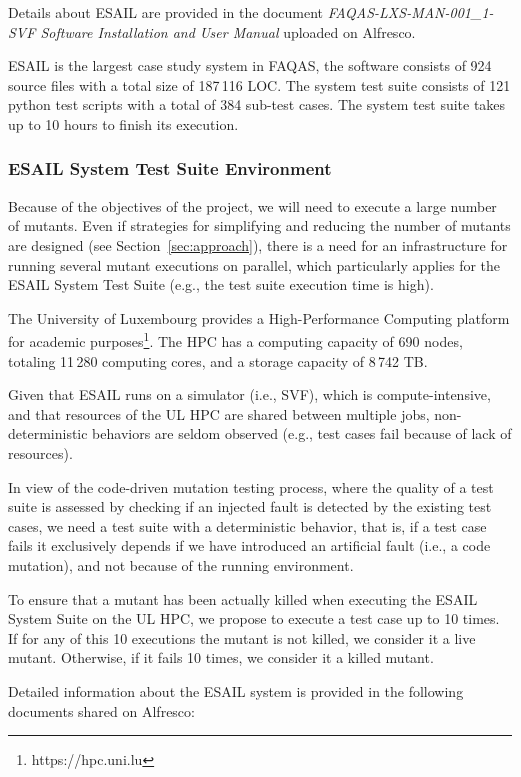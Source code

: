Details about ESAIL are provided in the document \emph{FAQAS-LXS-MAN-001\_1- SVF Software Installation and User Manual} uploaded on Alfresco.

ESAIL is the largest case study system in FAQAS, the software consists of 924 source files with a total size of 187\,116 LOC. The system test suite consists of 121 python test scripts with a total of 384 sub-test cases. The system test suite takes up to 10 hours to finish its execution.

\subsubsection{ESAIL System Test Suite Environment}

Because of the objectives of the project, we will need to execute a large number of mutants. Even if strategies for simplifying and reducing the number of mutants are designed (see Section~\ref{sec:approach}), there is a need for an infrastructure for running several mutant executions on parallel, which particularly applies for the ESAIL System Test Suite (e.g., the test suite execution time is high).

The University of Luxembourg provides a High-Performance Computing platform for academic purposes\footnote{https://hpc.uni.lu}.
The HPC has a computing capacity of 690 nodes, totaling 11\,280 computing cores, and a storage capacity of 8\,742 TB.

Given that ESAIL runs on a simulator (i.e., SVF), which is compute-intensive, and that resources of the UL HPC are shared between multiple jobs, non-deterministic behaviors are seldom observed (e.g., test cases fail because of lack of resources).

In view of the code-driven mutation testing process, where the quality of a test suite is assessed by checking if an injected fault is detected by the existing test cases, we need a test suite with a deterministic behavior, that is, if a test case fails it exclusively depends if we have introduced an artificial fault (i.e., a code mutation), and not because of the running environment.

To ensure that a mutant has been actually killed when executing the ESAIL System Suite on the UL HPC, we propose to execute a test case up to 10 times. If for any of this 10 executions the mutant is not killed, we consider it a live mutant. Otherwise, if it fails 10 times, we consider it a killed mutant.


Detailed information about the ESAIL system is provided in the following documents shared on Alfresco:

